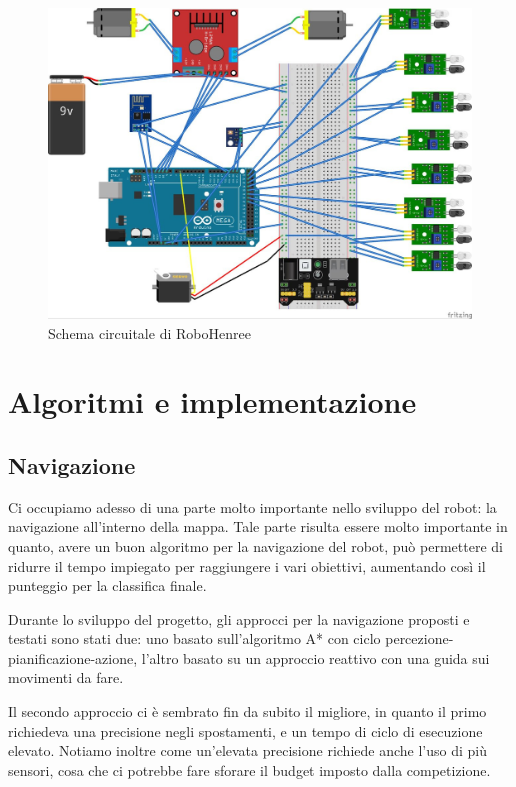\documentclass[a4paper,12pt,italian]{article}
\begin{document}
\begin{figure}[H]
	\begin{center}
	\includegraphics[scale=0.15]{circuito}
	\caption{Schema circuitale di RoboHenree}
	\label{Fig: circuito}
	\end{center}
\end{figure}

\section{Algoritmi e implementazione}

\subsection{Navigazione}
Ci occupiamo adesso di una parte molto importante nello sviluppo del robot: la navigazione all'interno della mappa. Tale parte risulta essere molto importante in quanto, avere un buon algoritmo per la navigazione del robot, può permettere di ridurre il tempo impiegato per raggiungere i vari obiettivi, aumentando così il punteggio per la classifica finale.

Durante lo sviluppo del progetto, gli approcci per la navigazione proposti e testati sono stati due: uno basato sull'algoritmo A* con ciclo percezione-pianificazione-azione, l'altro basato su un approccio reattivo con una guida sui movimenti da fare.

Il secondo approccio ci è sembrato fin da subito il migliore, in quanto il primo richiedeva una precisione negli spostamenti, e un tempo di ciclo di esecuzione elevato. Notiamo inoltre come un'elevata precisione richiede anche l'uso di più sensori, cosa che ci potrebbe fare sforare il budget imposto dalla competizione.
\end{document}
